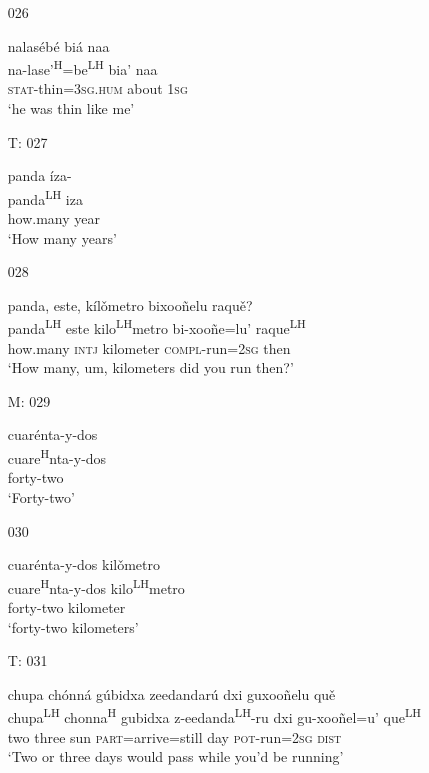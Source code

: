 \begin{itemize}
\item[026]
    
\glll nalas\'{e}b\'{e} bi\'{a} naa\\
na-lase'\textsuperscript{H}=be\textsuperscript{LH} bia' naa\\
\textsc{stat}-thin=\textsc{3sg.hum} about \textsc{1sg}\\
\glt `he was thin like me'
 


\item[T: 027]
   
panda \'{i}za-\\
panda\textsuperscript{LH} iza\\
how.many year\\
\glt `How many years'
 

\item[028]
   
panda, este, k\'{i}l\v{o}metro bixoo\~{n}elu raqu\v{e}?\\
panda\textsuperscript{LH}  este kilo\textsuperscript{LH}metro bi-xoo\~{n}e=lu' raque\textsuperscript{LH} \\
how.many \textsc{intj} kilometer \textsc{compl}-run=\textsc{2sg} then\\
\glt `How many, um, kilometers did you run then?'
 

\item[M: 029]
  
\glll cuar\'{e}nta-y-dos\\
cuare\textsuperscript{H}nta-y-dos\\
forty-two\\
\glt `Forty-two'
 

\item[030]
  
\glll cuar\'{e}nta-y-dos kil\v{o}metro\\
cuare\textsuperscript{H}nta-y-dos kilo\textsuperscript{LH}metro\\
forty-two kilometer\\
\glt `forty-two kilometers'
 

\item[T: 031]
 
\glll  chupa ch\'{o}nn\'{a} g\'{u}bidxa zeedandar\'{u} dxi guxoo\~{n}elu qu\v{e}\\
chupa\textsuperscript{LH} chonna\textsuperscript{H} gubidxa z-eedanda\textsuperscript{LH}-ru dxi gu-xoo\~{n}el=u' que\textsuperscript{LH}\\
two three sun \textsc{part}=arrive=still day \textsc{pot}-run=\textsc{2sg} \textsc{dist}\\
\glt `Two or three days would pass while you'd be running'
 


\end{itemize}
